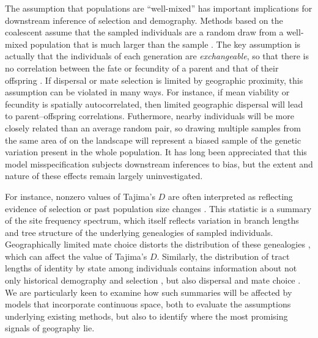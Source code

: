 \documentclass[11pt,twoside,lineno]{preprint}
\begin{document}
The assumption that populations are ``well-mixed'' has important implications for downstream inference of selection and demography. 
Methods based on the coalescent \citep{Kingman1982,wakeley2005coalescent} assume that the sampled individuals are a random draw from a well-mixed population
that is much larger than the sample \citep{wakeley2003gene}.
The key assumption is actually that the individuals of each generation are \emph{exchangeable},
so that there is no correlation between the fate or fecundity of a parent and that of their offspring \citep{Huillet2011}.
If dispersal or mate selection is limited by geographic proximity, this assumption can be violated in many ways.
For instance, if mean viability or fecundity is spatially autocorrelated,
then limited geographic dispersal will lead to parent--offspring correlations.
Futhermore, nearby individuals will be more closely related than an average random pair,
so drawing multiple samples from the same area of on the landscape will represent a biased sample of the genetic variation present in the whole population. 
It has long been appreciated that this model misspecification subjects downstream inferences to bias, 
but the extent and nature of these effects remain largely uninvestigated.

For instance, nonzero values of Tajima's $D$ are often interpreted as reflecting evidence of selection or past population size changes \citep{tajima1989statistical}.
This statistic is a summary of the site frequency spectrum, which itself reflects variation in branch lengths and tree structure of the underlying genealogies of sampled individuals.
Geographically limited mate choice distorts the distribution of these genealogies \citep{Maruyama1972},
which can affect the value of Tajima's $D$.
Similarly, the distribution of tract lengths of identity by state among individuals contains information about not only
historical demography \citep{Harris2013,ralph2013geography} and selection \citep{Garud2015}, but also dispersal and mate choice \citep{Ringbauer2017,Baharian2016}. 
We are particularly keen to examine how such summaries will be affected by models that incorporate continuous space,
both to evaluate the assumptions underlying existing methods, but also to identify where the most promising signals of geography lie.
\end{document}
